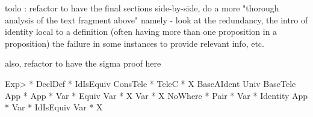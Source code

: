todo : refactor to have the final sections side-by-side, do a more "thorough analysis of the text fragment above"
namely - look at the redundancy, the intro of identity local to a definition (often having more than one proposition in a proposition) 
the failure in some instances to provide relevant info, etc.

also, refactor to have the sigma proof here

Exp> * DeclDef
    * IdIsEquiv
      ConsTele
        * TeleC
            * X
              BaseAIdent
              Univ
          BaseTele
      App
        * App
            * Var
                * Equiv
              Var
                * X
          Var
            * X
      NoWhere
        * Pair
            * Var
                * Identity
              App
                * Var
                    * IdIsEquiv
                  Var
                    * X



